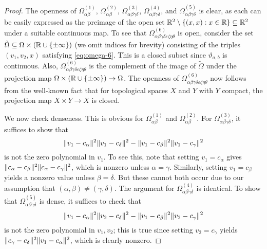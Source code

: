 \documentclass[11pt]{amsart}
\theoremstyle{definition}
\DeclarePairedDelimiter{\set}{\{}{\}}
\DeclarePairedDelimiter{\Abs}{\lVert}{\rVert}
\newcommand{\eps}{\varepsilon}
\newcommand{\RR}{\mathbb{R}}
\begin{document}
\begin{proof}
The openness of $\Omega^{(1)}_{\alpha\beta}$, $\Omega^{(2)}_{\alpha\beta}$, $\Omega^{(3)}_{\alpha\beta\gamma\delta}$, $\Omega^{(4)}_{\alpha\beta\gamma\delta}$, and $\Omega^{(5)}_{\alpha\beta\gamma\delta}$ is clear, as each can be easily expressed as the preimage of the open set $\RR^2 \setminus \set{(x,x):x \in \RR} \subseteq \RR^2$ under a suitable continuous map. To see that $\Omega^{(6)}_{\alpha\beta\gamma\delta\eps\zeta\eta\theta}$ is open, consider the set $\tilde \Omega \subseteq \Omega \times (\RR \cup \set{\pm\infty})$ (we omit indices for brevity) consisting of the triples $(v_1,v_2, x)$ satisfying \eqref{eq:omega-6}.
This is a closed subset since $\vartheta_{a,b}$ is continuous. Also, $\Omega^{(6)}_{\alpha\beta\gamma\delta\eps\zeta\eta\theta}$  is the complement of the image of $\tilde \Omega$ under the projection map $\Omega \times (\RR \cup \set{\pm\infty}) \to \Omega$. The openness of $\Omega^{(6)}_{\alpha\beta\gamma\delta\eps\zeta\eta\theta}$ now follows from the well-known fact that for topological spaces $X$ and $Y$ with $Y$ compact, the projection map $X \times Y \to X$ is closed.

We now check denseness.  This is obvious for $\Omega^{(1)}_{\alpha\beta}$ and $\Omega^{(2)}_{\alpha\beta}$. For $\Omega^{(3)}_{\alpha\beta\gamma\delta}$, it suffices to show that
\[\Abs{v_1 - c_\alpha}^2\Abs{v_1 - c_\delta}^2 - \Abs{v_1 - c_\beta}^2\Abs{v_1 - c_\gamma}^2\]
is not the zero polynomial in $v_1$. To see this, note that setting $v_1=c_\alpha$ gives $\Abs{c_\alpha-c_\beta}^2\Abs{c_\alpha-c_\gamma}^2$, which is nonzero unless $\alpha = \gamma$. Similarly, setting $v_1 = c_\beta$ yields a nonzero value unless $\beta = \delta$. But these cannot both occur due to our assumption that $(\alpha, \beta) \neq (\gamma, \delta)$. The argument for $\Omega^{(4)}_{\alpha\beta\gamma\delta}$ is identical. To show that $\Omega^{(5)}_{\alpha\beta\gamma\delta}$ is dense, it suffices to check that
\[\Abs{v_1 - c_\alpha}^2\Abs{v_2 - c_\delta}^2 - \Abs{v_1 - c_\beta}^2\Abs{v_2 - c_\gamma}^2\]
is not the zero polynomial in $v_1,v_2$; this is true since setting $v_2 = c_\gamma$ yields $\Abs{c_\gamma - c_\delta}^2 \Abs{v_1 - c_\alpha}^2$, which is clearly nonzero.


\end{proof}
\end{document}

